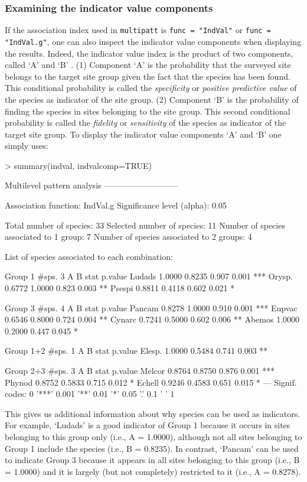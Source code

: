 \documentclass[11pt,a4paper]{article}
\begin{document}
\subsubsection{Examining the indicator value components}
If the association index used in \texttt{multipatt} is \texttt{func = "IndVal"} or \texttt{func = "IndVal.g"}, one can also inspect the indicator value components when displaying the results. Indeed, the indicator value index is the product of two components, called `A' and `B' \citep{Dufrene1997}\citep{DeCaceres2009}. (1) Component `A' is the probability that the surveyed site belongs to the target site group given the fact that the species has been found. This conditional probability is called the \emph{specificity} or \emph{positive predictive value} of the species as indicator of the site group. (2) Component `B' is the probability of finding the species in sites belonging to the site group. This second conditional probability is called the \emph{fidelity} or \emph{sensitivity} of the species as indicator of the target site group. To display the indicator value components `A' and `B' one simply uses:
\begin{Schunk}
\begin{Sinput}
> summary(indval, indvalcomp=TRUE)
\end{Sinput}
\begin{Soutput}
 Multilevel pattern analysis
 ---------------------------

 Association function: IndVal.g
 Significance level (alpha): 0.05

 Total number of species: 33
 Selected number of species: 11 
 Number of species associated to 1 group: 7 
 Number of species associated to 2 groups: 4 

 List of species associated to each combination: 

 Group 1  #sps.  3 
            A      B  stat p.value    
Ludads 1.0000 0.8235 0.907   0.001 ***
Orysp. 0.6772 1.0000 0.823   0.003 ** 
Psespi 0.8811 0.4118 0.602   0.021 *  

 Group 3  #sps.  4 
            A      B  stat p.value    
Pancam 0.8278 1.0000 0.910   0.001 ***
Eupvac 0.6546 0.8000 0.724   0.004 ** 
Cynarc 0.7241 0.5000 0.602   0.006 ** 
Abemos 1.0000 0.2000 0.447   0.045 *  

 Group 1+2  #sps.  1 
            A      B  stat p.value   
Elesp. 1.0000 0.5484 0.741   0.003 **

 Group 2+3  #sps.  3 
            A      B  stat p.value    
Melcor 0.8764 0.8750 0.876   0.001 ***
Phynod 0.8752 0.5833 0.715   0.012 *  
Echell 0.9246 0.4583 0.651   0.015 *  
---
Signif. codes:  0 '***' 0.001 '**' 0.01 '*' 0.05 '.' 0.1 ' ' 1 
\end{Soutput}
\end{Schunk}
This gives us additional information about why species can be used as indicators. For example, `Ludads' is a good indicator of Group 1 because it occurs in sites belonging to this group only (i.e., A = 1.0000), although not all sites belonging to Group 1 include the species (i.e., B = 0.8235). In contrast, `Pancam' can be used to indicate Group 3 because it appears in all sites belonging to this group (i.e., B = 1.0000) and it is largely (but not completely) restricted to it (i.e., A = 0.8278).
\end{document}
